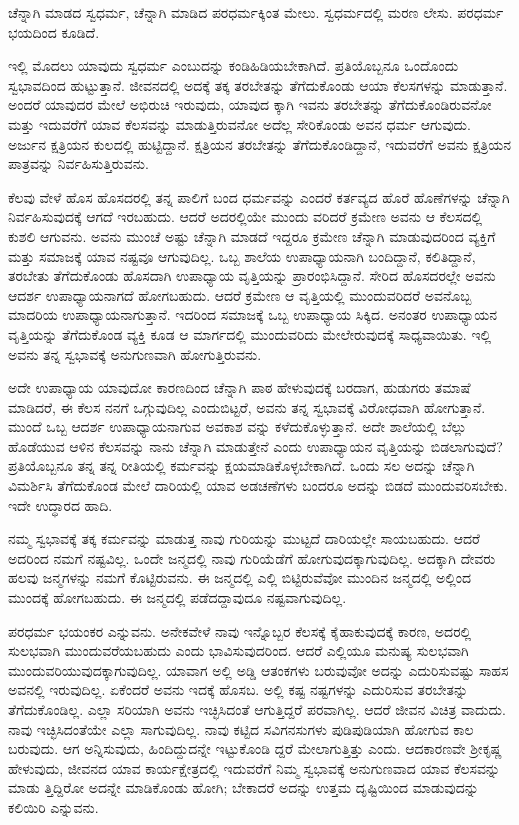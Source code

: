 {\small ಚೆನ್ನಾಗಿ ಮಾಡದ ಸ್ವಧರ್ಮ, ಚೆನ್ನಾಗಿ ಮಾಡಿದ ಪರಧರ್ಮಕ್ಕಿಂತ ಮೇಲು. ಸ್ವಧರ್ಮದಲ್ಲಿ ಮರಣ ಲೇಸು. ಪರಧರ್ಮ ಭಯದಿಂದ ಕೂಡಿದೆ.}

ಇಲ್ಲಿ ಮೊದಲು ಯಾವುದು ಸ್ವಧರ್ಮ ಎಂಬುದನ್ನು ಕಂಡಿಹಿಡಿಯಬೇಕಾಗಿದೆ. ಪ್ರತಿಯೊಬ್ಬನೂ ಒಂದೊಂದು ಸ್ವಭಾವದಿಂದ ಹುಟ್ಟುತ್ತಾನೆ. ಜೀವನದಲ್ಲಿ ಅದಕ್ಕೆ ತಕ್ಕ ತರಬೇತನ್ನು ತೆಗೆದುಕೊಂಡು ಆಯಾ ಕೆಲಸಗಳನ್ನು ಮಾಡುತ್ತಾನೆ. ಅಂದರೆ ಯಾವುದರ ಮೇಲೆ ಅಭಿರುಚಿ ಇರುವುದು, ಯಾವುದ ಕ್ಕಾಗಿ ಇವನು ತರಬೇತನ್ನು ತೆಗೆದುಕೊಂಡಿರುವನೋ ಮತ್ತು ಇದುವರೆಗೆ ಯಾವ ಕೆಲಸವನ್ನು ಮಾಡುತ್ತಿರುವನೋ ಅದೆಲ್ಲ ಸೇರಿಕೊಂಡು ಅವನ ಧರ್ಮ ಆಗುವುದು. ಅರ್ಜುನ ಕ್ಷತ್ರಿಯನ ಕುಲದಲ್ಲಿ ಹುಟ್ಟಿದ್ದಾನೆ. ಕ್ಷತ್ರಿಯನ ತರಬೇತನ್ನು ತೆಗೆದುಕೊಂಡಿದ್ದಾನೆ, ಇದುವರೆಗೆ ಅವನು ಕ್ಷತ್ರಿಯನ ಪಾತ್ರವನ್ನು ನಿರ್ವಹಿಸುತ್ತಿರುವನು.

ಕೆಲವು ವೇಳೆ ಹೊಸ ಹೊಸದರಲ್ಲಿ ತನ್ನ ಪಾಲಿಗೆ ಬಂದ ಧರ್ಮವನ್ನು ಎಂದರೆ ಕರ್ತವ್ಯದ ಹೊರೆ ಹೊಣೆಗಳನ್ನು ಚೆನ್ನಾಗಿ ನಿರ್ವಹಿಸುವುದಕ್ಕೆ ಆಗದೆ ಇರಬಹುದು. ಆದರೆ ಅದರಲ್ಲಿಯೇ ಮುಂದು ವರಿದರೆ ಕ್ರಮೇಣ ಅವನು ಆ ಕೆಲಸದಲ್ಲಿ ಕುಶಲಿ ಆಗುವನು. ಅವನು ಮುಂಚೆ ಅಷ್ಟು ಚೆನ್ನಾಗಿ ಮಾಡದೆ ಇದ್ದರೂ ಕ್ರಮೇಣ ಚೆನ್ನಾಗಿ ಮಾಡುವುದರಿಂದ ವ್ಯಕ್ತಿಗೆ ಮತ್ತು ಸಮಾಜಕ್ಕೆ ಯಾವ ನಷ್ಟವೂ ಆಗುವುದಿಲ್ಲ. ಒಬ್ಬ ಶಾಲೆಯ ಉಪಾಧ್ಯಾಯನಾಗಿ ಬಂದಿದ್ದಾನೆ, ಕಲಿತಿದ್ದಾನೆ, ತರಬೇತು ತೆಗೆದುಕೊಂಡು ಹೊಸದಾಗಿ ಉಪಾಧ್ಯಾಯ ವೃತ್ತಿಯನ್ನು ಪ್ರಾರಂಭಿಸಿದ್ದಾನೆ. ಸೇರಿದ ಹೊಸದರಲ್ಲೇ ಅವನು ಆದರ್ಶ ಉಪಾಧ್ಯಾಯನಾಗದೆ ಹೋಗಬಹುದು. ಆದರೆ ಕ್ರಮೇಣ ಆ ವೃತ್ತಿಯಲ್ಲಿ ಮುಂದುವರಿದರೆ ಅವನೊಬ್ಬ ಮಾದರಿಯ ಉಪಾಧ್ಯಾಯನಾಗುತ್ತಾನೆ. ಇದರಿಂದ ಸಮಾಜಕ್ಕೆ ಒಬ್ಬ ಉಪಾಧ್ಯಾಯ ಸಿಕ್ಕಿದ. ಅನಂತರ ಉಪಾಧ್ಯಾಯನ ವೃತ್ತಿಯನ್ನು ತೆಗೆದುಕೊಂಡ ವ್ಯಕ್ತಿ ಕೂಡ ಆ ಮಾರ್ಗದಲ್ಲಿ ಮುಂದುವರಿದು ಮೇಲೇರುವುದಕ್ಕೆ ಸಾಧ್ಯವಾಯಿತು. ಇಲ್ಲಿ ಅವನು ತನ್ನ ಸ್ವಭಾವಕ್ಕೆ ಅನುಗುಣವಾಗಿ ಹೋಗುತ್ತಿರುವನು.

ಅದೇ ಉಪಾಧ್ಯಾಯ ಯಾವುದೋ ಕಾರಣದಿಂದ ಚೆನ್ನಾಗಿ ಪಾಠ ಹೇಳುವುದಕ್ಕೆ ಬರದಾಗ, ಹುಡುಗರು ತಮಾಷೆ ಮಾಡಿದರೆ, ಈ ಕೆಲಸ ನನಗೆ ಒಗ್ಗುವುದಿಲ್ಲ ಎಂದುಬಿಟ್ಟರೆ, ಅವನು ತನ್ನ ಸ್ವಭಾವಕ್ಕೆ ವಿರೋಧವಾಗಿ ಹೋಗುತ್ತಾನೆ. ಮುಂದೆ ಒಬ್ಬ ಆದರ್ಶ ಉಪಾಧ್ಯಾಯನಾಗುವ ಅವಕಾಶ ವನ್ನು ಕಳೆದುಕೊಳ್ಳುತ್ತಾನೆ. ಅದೇ ಶಾಲೆಯಲ್ಲಿ ಬೆಲ್ಲು ಹೊಡೆಯುವ ಆಳಿನ ಕೆಲಸವನ್ನು ನಾನು ಚೆನ್ನಾಗಿ ಮಾಡುತ್ತೇನೆ ಎಂದು ಉಪಾಧ್ಯಾಯನ ವೃತ್ತಿಯನ್ನು ಬಿಡಲಾಗುವುದೆ? ಪ್ರತಿಯೊಬ್ಬನೂ ತನ್ನ ತನ್ನ ರೀತಿಯಲ್ಲಿ ಕರ್ಮವನ್ನು ಕ್ಷಯಮಾಡಿಕೊಳ್ಳಬೇಕಾಗಿದೆ. ಒಂದು ಸಲ ಅದನ್ನು ಚೆನ್ನಾಗಿ ವಿಮರ್ಶಿಸಿ ತೆಗೆದುಕೊಂಡ ಮೇಲೆ ದಾರಿಯಲ್ಲಿ ಯಾವ ಅಡಚಣೆಗಳು ಬಂದರೂ ಅದನ್ನು ಬಿಡದೆ ಮುಂದುವರಿಸಬೇಕು. ಇದೇ ಉದ್ಧಾರದ ಹಾದಿ.

ನಮ್ಮ ಸ್ವಭಾವಕ್ಕೆ ತಕ್ಕ ಕರ್ಮವನ್ನು ಮಾಡುತ್ತ ನಾವು ಗುರಿಯನ್ನು ಮುಟ್ಟದೆ ದಾರಿಯಲ್ಲೇ ಸಾಯಬಹುದು. ಆದರೆ ಅದರಿಂದ ನಮಗೆ ನಷ್ಟವಿಲ್ಲ. ಒಂದೇ ಜನ್ಮದಲ್ಲಿ ನಾವು ಗುರಿಯೆಡೆಗೆ ಹೋಗುವುದಕ್ಕಾಗುವುದಿಲ್ಲ. ಅದಕ್ಕಾಗಿ ದೇವರು ಹಲವು ಜನ್ಮಗಳನ್ನು ನಮಗೆ ಕೊಟ್ಟಿರುವನು. ಈ ಜನ್ಮದಲ್ಲಿ ಎಲ್ಲಿ ಬಿಟ್ಟಿರುವೆವೋ ಮುಂದಿನ ಜನ್ಮದಲ್ಲಿ ಅಲ್ಲಿಂದ ಮುಂದಕ್ಕೆ ಹೋಗಬಹುದು. ಈ ಜನ್ಮದಲ್ಲಿ ಪಡೆದದ್ದಾವುದೂ ನಷ್ಟವಾಗುವುದಿಲ್ಲ.

ಪರಧರ್ಮ ಭಯಂಕರ ಎನ್ನುವನು. ಅನೇಕವೇಳೆ ನಾವು ಇನ್ನೊಬ್ಬರ ಕೆಲಸಕ್ಕೆ ಕೈಹಾಕುವುದಕ್ಕೆ ಕಾರಣ, ಅದರಲ್ಲಿ ಸುಲಭವಾಗಿ ಮುಂದುವರೆಯಬಹುದು ಎಂದು ಭಾವಿಸುವುದರಿಂದ. ಆದರೆ ಎಲ್ಲಿಯೂ ಮನುಷ್ಯ ಸುಲಭವಾಗಿ ಮುಂದುವರಿಯುವುದಕ್ಕಾಗುವುದಿಲ್ಲ. ಯಾವಾಗ ಅಲ್ಲಿ ಅಡ್ಡಿ ಆತಂಕಗಳು ಬರುವುವೋ ಅದನ್ನು ಎದುರಿಸುವಷ್ಟು ಸಾಹಸ ಅವನಲ್ಲಿ ಇರುವುದಿಲ್ಲ. ಏಕೆಂದರೆ ಅವನು ಇದಕ್ಕೆ ಹೊಸಬ. ಅಲ್ಲಿ ಕಷ್ಟ ನಷ್ಟಗಳನ್ನು ಎದುರಿಸುವ ತರಬೇತನ್ನು ತೆಗೆದುಕೊಂಡಿಲ್ಲ. ಎಲ್ಲಾ ಸರಿಯಾಗಿ ಅವನು ಇಚ್ಛಿಸಿದಂತೆ ಆಗುತ್ತಿದ್ದರೆ ಪರವಾಗಿಲ್ಲ. ಆದರೆ ಜೀವನ ವಿಚಿತ್ರ ವಾದುದು. ನಾವು ಇಚ್ಛಿಸಿದಂತೆಯೇ ಎಲ್ಲಾ ಸಾಗುವುದಿಲ್ಲ. ನಾವು ಕಟ್ಟಿದ ಸವಿಗನಸುಗಳು ಪುಡಿಪುಡಿಯಾಗಿ ಹೋಗುವ ಕಾಲ ಬರುವುದು. ಆಗ ಅನ್ನಿಸುವುದು, ಹಿಂದಿದ್ದುದನ್ನೇ ಇಟ್ಟುಕೊಂಡಿ ದ್ದರೆ ಮೇಲಾಗುತ್ತಿತ್ತು ಎಂದು. ಆದಕಾರಣವೇ ಶ್ರೀಕೃಷ್ಣ ಹೇಳುವುದು, ಜೀವನದ ಯಾವ ಕಾರ್ಯಕ್ಷೇತ್ರದಲ್ಲಿ ಇದುವರೆಗೆ ನಿಮ್ಮ ಸ್ವಭಾವಕ್ಕೆ ಅನುಗುಣವಾದ ಯಾವ ಕೆಲಸವನ್ನು ಮಾಡು ತ್ತಿದ್ದಿರೋ ಅದನ್ನೇ ಮಾಡಿಕೊಂಡು ಹೋಗಿ; ಬೇಕಾದರೆ ಅದನ್ನು ಉತ್ತಮ ದೃಷ್ಟಿಯಿಂದ ಮಾಡುವುದನ್ನು ಕಲಿಯಿರಿ ಎನ್ನುವನು.

